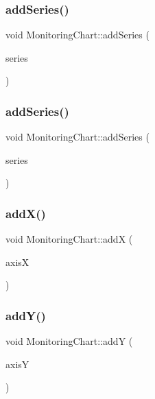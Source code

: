 \subsubsection{\texorpdfstring{add\+Series()}{addSeries()}\hspace{0.1cm}{\footnotesize\ttfamily [1/2]}}
{\footnotesize\ttfamily void Monitoring\+Chart\+::add\+Series (\begin{DoxyParamCaption}\item[{Q\+Line\+Series $\ast$}]{series }\end{DoxyParamCaption})}

\mbox{\label{class_monitoring_chart_ad546d13e03b26c435c1df4c6e04bb7e4}} 
\subsubsection{\texorpdfstring{add\+Series()}{addSeries()}\hspace{0.1cm}{\footnotesize\ttfamily [2/2]}}
{\footnotesize\ttfamily void Monitoring\+Chart\+::add\+Series (\begin{DoxyParamCaption}\item[{Q\+Scatter\+Series $\ast$}]{series }\end{DoxyParamCaption})}

\mbox{\label{class_monitoring_chart_af038df2992a94b666f292a01a258d78c}} 
\subsubsection{\texorpdfstring{add\+X()}{addX()}}
{\footnotesize\ttfamily void Monitoring\+Chart\+::addX (\begin{DoxyParamCaption}\item[{Q\+Date\+Time\+Axis $\ast$}]{axisX }\end{DoxyParamCaption})}

\mbox{\label{class_monitoring_chart_a9247ab0e44af4bcfc0ae29156072067f}} 
\subsubsection{\texorpdfstring{add\+Y()}{addY()}}
{\footnotesize\ttfamily void Monitoring\+Chart\+::addY (\begin{DoxyParamCaption}\item[{Q\+Value\+Axis $\ast$}]{axisY }\end{DoxyParamCaption})}

